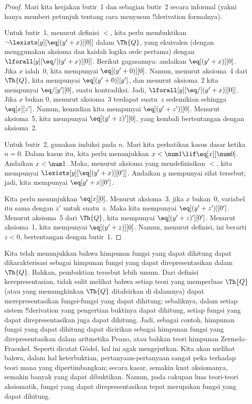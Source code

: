\documentclass[../../../include/open-logic-section]{subfiles}
\begin{document}
\begin{proof}
Mari kita kerjakan butir~1 dan sebagian butir~2 secara informal (yakni hanya
memberi petunjuk tentang cara menyusun !!{derivation} formalnya).

Untuk butir~1, menurut definisi $<$, kita perlu membuktikan
$\lnot \lexists[y][\eq[(y'+x)][0]]$ dalam $\Th{Q}$, yang ekuivalen
(dengan menggunakan aksioma dan kaidah logika orde pertama) dengan
$\lforall[y][\eq/[(y' + x)][0]]$. Berikut gagasannya: andaikan
$\eq[(y'+x)][0]$. Jika $x$ ialah~0, kita mempunyai
$\eq[(y' + 0)][0]$. Namun, menurut aksioma~4 dari $\Th{Q}$, kita mempunyai
$\eq[(y' + 0)][y']$, dan menurut aksioma~2 kita mempunyai $\eq/[y'][0]$,
suatu kontradiksi. Jadi, $\lforall[y][\eq/[(y' +x)][0]]$. Jika $x$ bukan
$0$, menurut aksioma~3 terdapat suatu~$z$ sedemikian sehingga
$\eq[x][z']$. Namun, kemudian kita mempunyai $\eq[(y' + z')][0]$.
Menurut aksioma~5, kita mempunyai $\eq[(y' + z)'][0]$, yang kembali
bertentangan dengan aksioma~2.

Untuk butir~2, gunakan induksi pada $n$. Mari kita perhatikan kasus dasar
ketika $n =0$. Dalam kasus itu, kita perlu menunjukkan
$x < \num 1 \lif \eq[x][\num 0]$. Andaikan $x < \num 1$. Maka, menurut
aksioma yang mendefinisikan $<$, kita mempunyai
$\lexists[y][\eq[(y'+x)][0']]$. Andaikan $y$ mempunyai sifat tersebut;
jadi, kita mempunyai $\eq[y'+x][0']$.

Kita perlu menunjukkan $\eq[x][0]$. Menurut aksioma~3, jika $x$ bukan~0,
variabel itu sama dengan $z'$ untuk suatu~$z$. Maka kita mempunyai
$\eq[(y' + z')][0']$. Menurut aksioma~5 dari $\Th{Q}$, kita mempunyai
$\eq[(y'+z)'][0']$. Menurut aksioma~1, kita mempunyai
$\eq[(y' + z)][0]$. Namun, menurut definisi, ini berarti $z < 0$,
bertentangan dengan butir~1.
\end{proof}

\begin{explain}
Kita telah menunjukkan bahwa himpunan fungsi yang dapat dihitung dapat
dikarakterisasi sebagai himpunan fungsi yang dapat direpresentasikan dalam
$\Th{Q}$. Bahkan, pembuktian tersebut lebih umum. Dari definisi
kerepresentasian, tidak sulit melihat bahwa setiap teori yang memperluas
$\Th{Q}$ (atau yang memungkinkan $\Th{Q}$ ditafsirkan di dalamnya) dapat
merepresentasikan fungsi-fungsi yang dapat dihitung; sebaliknya, dalam setiap
sistem !!{derivation} yang pengertian buktinya dapat dihitung, setiap fungsi
yang dapat direpresentasikan juga dapat dihitung. Jadi, sebagai contoh,
himpunan fungsi yang dapat dihitung dapat dicirikan sebagai himpunan fungsi
yang direpresentasikan dalam aritmetika Peano, atau bahkan teori himpunan
Zermelo--Fraenkel. Seperti dicatat G\"odel, hal ini agak mengejutkan. Kita
akan melihat bahwa, dalam hal keterbuktian, pertanyaan-pertanyaan sangat peka
terhadap teori mana yang dipertimbangkan; secara kasar, semakin kuat
aksiomanya, semakin banyak yang dapat dibuktikan. Namun, pada cakupan luas
teori-teori aksiomatik, fungsi yang dapat direpresentasikan tepat merupakan
fungsi yang dapat dihitung.
\end{explain}
\end{document}

